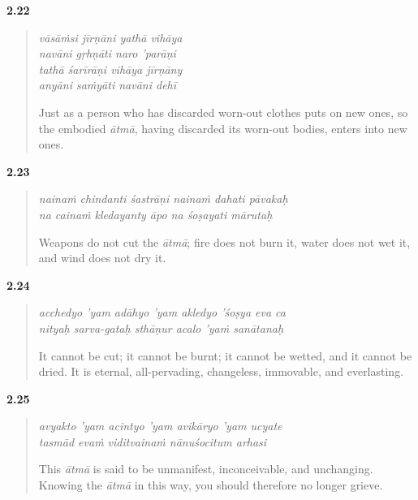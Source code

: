 \par\noindent\textbf{2.22}\par
\begin{verse}
\textit{vāsāṁsi jīrṇāni yathā vihāya} \\
\textit{navāni gṛhṇāti naro ’parāṇi} \\
\textit{tathā śarīrāṇi vihāya jīrṇāny} \\
\textit{anyāni saṁyāti navāni dehī}

\noindent Just as a person who has discarded worn-out clothes puts on new ones, so the embodied \textit{ātmā}, having discarded its worn-out bodies, enters into new ones.
\end{verse}
\par



\par\noindent\textbf{2.23}\par
\begin{verse}
\textit{nainaṁ chindanti śastrāṇi nainaṁ dahati pāvakaḥ} \\
\textit{na cainaṁ kledayanty āpo na śoṣayati mārutaḥ}

\noindent Weapons do not cut the \textit{ātmā}; fire does not burn it, water does not wet it, and wind does not dry it.
\end{verse}
\par



\par\noindent\textbf{2.24}\par
\begin{verse}
\textit{acchedyo ’yam adāhyo ’yam akledyo ’śoṣya eva ca} \\
\textit{nityaḥ sarva-gataḥ sthāṇur acalo ’yaṁ sanātanaḥ}

\noindent It cannot be cut; it cannot be burnt; it cannot be wetted, and it cannot be dried. It is eternal, all-pervading, changeless, immovable, and everlasting.
\end{verse}
\par



\par\noindent\textbf{2.25}\par
\begin{verse}
\textit{avyakto ’yam acintyo ’yam avikāryo ’yam ucyate} \\
\textit{tasmād evaṁ viditvainaṁ nānuśocitum arhasi}

\noindent This \textit{ātmā} is said to be unmanifest, inconceivable, and unchanging. Knowing the \textit{ātmā} in this way, you should therefore no longer grieve.
\end{verse}
\par



